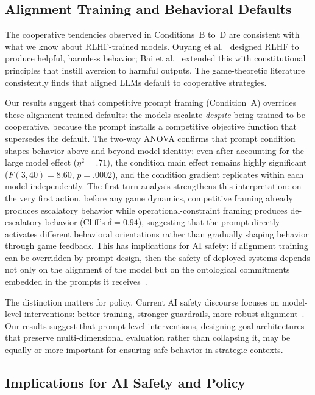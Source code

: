 \documentclass[manuscript, review=true, anonymous=true]{acmart}
\begin{document}
\subsection{Alignment Training and Behavioral Defaults}

The cooperative tendencies observed in Conditions~B to~D are consistent with what we know about RLHF-trained models.
Ouyang et al.~\cite{ouyang2022training} designed RLHF to produce helpful, harmless behavior; Bai et al.~\cite{bai2022constitutional} extended this with constitutional principles that instill aversion to harmful outputs.
The game-theoretic literature~\cite{akata2025playing,mei2024turing,duan2024gtbench} consistently finds that aligned LLMs default to cooperative strategies.

Our results suggest that competitive prompt framing (Condition~A) overrides these alignment-trained defaults: the models escalate \emph{despite} being trained to be cooperative, because the prompt installs a competitive objective function that supersedes the default.
The two-way ANOVA confirms that prompt condition shapes behavior above and beyond model identity: even after accounting for the large model effect ($\eta^2 = .71$), the condition main effect remains highly significant ($F(3, 40) = 8.60$, $p = .0002$), and the condition gradient replicates within each model independently.
The first-turn analysis strengthens this interpretation: on the very first action, before any game dynamics, competitive framing already produces escalatory behavior while operational-constraint framing produces de-escalatory behavior (Cliff's $\delta = 0.94$), suggesting that the prompt directly activates different behavioral orientations rather than gradually shaping behavior through game feedback.
This has implications for AI safety: if alignment training can be overridden by prompt design, then the safety of deployed systems depends not only on the alignment of the model but on the ontological commitments embedded in the prompts it receives~\cite{perez2023discovering,sharma2024sycophancy}.

The distinction matters for policy.
Current AI safety discourse focuses on model-level interventions: better training, stronger guardrails, more robust alignment~\cite{bai2022constitutional}.
Our results suggest that prompt-level interventions, designing goal architectures that preserve multi-dimensional evaluation rather than collapsing it, may be equally or more important for ensuring safe behavior in strategic contexts.

\subsection{Implications for AI Safety and Policy}
\end{document}
